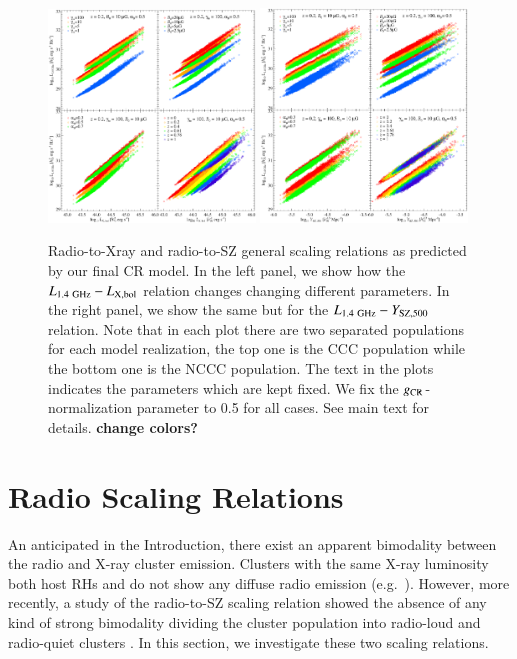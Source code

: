 \documentclass[traditabstract]{aa}
\newcommand{\rmn}{\mathrm}
\begin{document}
\begin{figure}[hbt!]
\centering
\includegraphics[width=0.49\textwidth]{figures/PL_relation_testing_gimp.eps}
\includegraphics[width=0.49\textwidth]{figures/PSZ_relation_testing_gimp.eps}
\caption{Radio-to-Xray and radio-to-SZ general scaling relations as predicted by our final CR model. In the left panel, we show how the $L_{1.4~\rmn{GHz}}-L_{\rm{X,bol}}$ relation changes changing different parameters. In the right panel, we show the same but for the $L_{1.4~\rmn{GHz}}-Y_{\rm{SZ},500}$ relation. Note that in each plot there are two separated populations for each model realization, the top one is the CCC population while the bottom one is the NCCC population. The text in the plots indicates the parameters which are kept fixed. We fix the $g_{\rm{CR}}$-normalization parameter to 0.5 for all cases. See main text for details. {\bf change colors?}}
\label{fig:SR}
\end{figure}


\section{Radio Scaling Relations}
\label{sec:4}
An anticipated in the Introduction, there exist an apparent bimodality between the radio and X-ray cluster emission. Clusters with the same X-ray luminosity both host RHs and do not show any diffuse radio emission (e.g.~\citealp{2009A&A...507..661B,2011A&A...527A..99E}). However, more recently, a study of the radio-to-SZ scaling relation showed the absence of any kind of strong bimodality dividing the cluster population into radio-loud and radio-quiet clusters \citep{2012MNRAS.421L.112B}. In this section, we investigate these two scaling relations.
\end{document}

